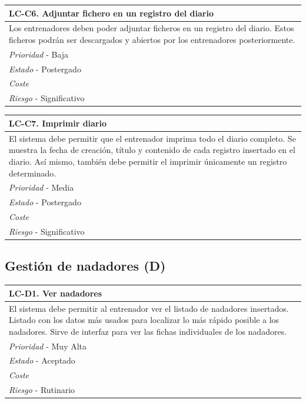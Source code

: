 	\begin{center}
		\begin{tabularx}{15cm}{|X|}
			\hline 
				\bf{LC-C6. Adjuntar fichero en un registro del diario}\\
			\hline
				Los entrenadores deben poder adjuntar ficheros en un registro del diario. Estos ficheros podrán ser descargados y abiertos por los entrenadores posteriormente.\\
			\hline
				{\it Prioridad} - Baja\\
			\hline
				{\it Estado} - Postergado\\
			\hline
				{\it Coste}\\
			\hline
				{\it Riesgo} - Significativo\\
			\hline
		\end{tabularx}
	\end{center}
	
	\begin{center}
		\begin{tabularx}{15cm}{|X|}
			\hline 
				\bf{LC-C7. Imprimir diario}\\
			\hline
				El sistema debe permitir que el entrenador imprima todo el diario completo. Se muestra la fecha de creación, título y contenido de cada registro insertado en el diario. Así mismo, también debe permitir el imprimir únicamente un registro determinado.\\
			\hline
				{\it Prioridad} - Media\\
			\hline
				{\it Estado} - Postergado\\
			\hline
				{\it Coste}\\
			\hline
				{\it Riesgo} - Significativo\\
			\hline
		\end{tabularx}
	\end{center}


% 
%
\subsection{Gestión de nadadores (D)} %
	\label{sub:gestion_de_nadadores}
	
	\begin{center}
		\begin{tabularx}{15cm}{|X|}
			\hline 
				\bf{LC-D1. Ver nadadores}\\
			\hline
				El sistema debe permitir al entrenador ver el listado de nadadores insertados. Listado con los datos más usados para localizar lo más rápido posible a los nadadores. Sirve de interfaz para ver las fichas individuales de los nadadores.\\
			\hline
				{\it Prioridad} - Muy Alta\\
			\hline
				{\it Estado} - Aceptado\\
			\hline
				{\it Coste}\\
			\hline
				{\it Riesgo} - Rutinario\\
			\hline
		\end{tabularx}
	\end{center}
	
